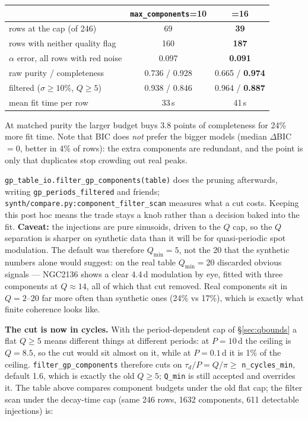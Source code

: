 \documentclass[11pt]{article}
\newcommand{\code}[1]{\texttt{#1}}
\begin{document}
\begin{center}
\begin{tabular}{lcc}
\toprule
 & \code{max\_components}=10 & =16 \\
\midrule
rows at the cap (of 246)                       & 69 & \textbf{39} \\
rows with neither quality flag                 & 160 & \textbf{187} \\
$\alpha$ error, all rows with red noise        & 0.097 & \textbf{0.091} \\
raw purity / completeness                      & 0.736 / 0.928 & 0.665 / \textbf{0.974} \\
filtered ($\sigma \geq 10\%$, $Q \geq 5$)      & 0.938 / 0.846 & 0.964 / \textbf{0.887} \\
mean fit time per row                          & 33\,s & 41\,s \\
\bottomrule
\end{tabular}
\end{center}

At matched purity the larger budget buys 3.8 points of completeness for 24\% more fit time.
Note that BIC does \emph{not} prefer the bigger models (median $\Delta$BIC $= 0$, better in
4\% of rows): the extra components are redundant, and the point is only that duplicates stop
crowding out real peaks.

\code{gp\_table\_io.filter\_gp\_components(table)} does the pruning afterwards, writing
\code{gp\_periods\_filtered} and friends; \code{synth/compare.py:component\_filter\_scan}
measures what a cut costs. Keeping this post hoc means the trade stays a knob rather than a
decision baked into the fit. \textbf{Caveat:} the injections are pure sinusoids, driven to
the $Q$ cap, so the $Q$ separation is sharper on synthetic data than it will be for
quasi-periodic spot modulation. The default was therefore $Q_{\min} = 5$, not the 20 that the
synthetic numbers alone would suggest: on the real table $Q_{\min} = 20$ discarded obvious
signals --- NGC2136 shows a clear 4.4\,d modulation by eye, fitted with three components at
$Q \approx 14$, all of which that cut removed. Real components sit in $Q = 2$--20 far more
often than synthetic ones (24\% vs 17\%), which is exactly what finite coherence looks like.

\textbf{The cut is now in cycles.} With the period-dependent cap of \S\ref{sec:qbounds} a
flat $Q \ge 5$ means different things at different periods: at $P = 10$\,d the ceiling is
$Q = 8.5$, so the cut would sit almost on it, while at $P = 0.1$\,d it is 1\% of the ceiling.
\code{filter\_gp\_components} therefore cuts on $\tau_d / P = Q/\pi \ge$
\code{n\_cycles\_min}, default 1.6, which is exactly the old $Q \ge 5$; \code{Q\_min} is
still accepted and overrides it. The table above compares component budgets under the old
flat cap; the filter scan under the decay-time cap (same 246 rows, 1632 components, 611
detectable injections) is:
\end{document}
